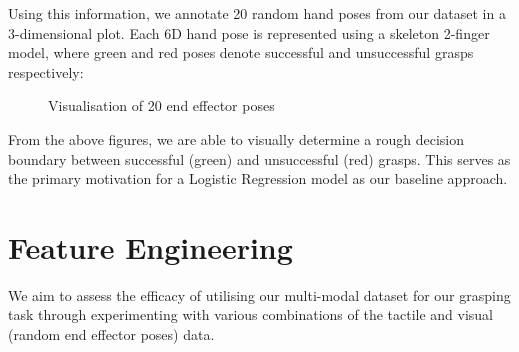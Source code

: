 \documentclass[12pt, a4paper]{report}
\theoremstyle{definition}
\begin{document}
\noindent Using this information, we annotate 20 random hand poses from our dataset in a 3-dimensional plot. Each 6D hand pose is represented using a skeleton 2-finger model, where green and red poses denote successful and unsuccessful grasps respectively:
\begin{figure}[H]%
    \centering
    \qquad
    \caption{Visualisation of 20 end effector poses}%
    \label{fig:hand_poses}%
\end{figure}
\noindent From the above figures, we are able to visually determine a rough decision boundary between successful (green) and unsuccessful (red) grasps. This serves as the primary motivation for a Logistic Regression model as our baseline approach.


\section{Feature Engineering}
\label{sec:4.3}
We aim to assess the efficacy of utilising our multi-modal dataset for our grasping task through experimenting with various combinations of the tactile and visual (random end effector poses) data.
\end{document}
